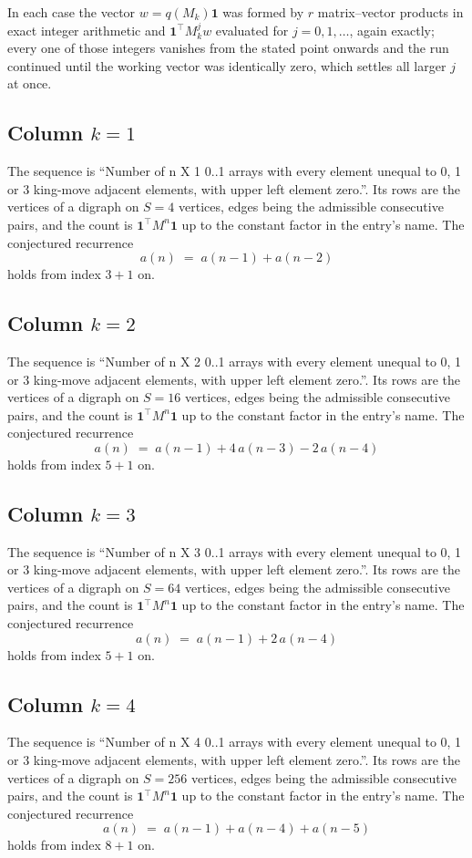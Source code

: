 \documentclass[11pt,a4paper]{article}
\theoremstyle{plain}
\theoremstyle{definition}
\begin{document}
In each case the vector $w=q(M_k)\mathbf{1}$ was formed by $r$ matrix--vector products in
exact integer arithmetic and $\mathbf{1}^{\!\top}M_k^{j}w$ evaluated for $j=0,1,\dots$,
again exactly; every one of those integers vanishes from the stated point onwards and the run
continued until the working vector was identically zero, which settles all larger $j$ at once.

\subsection*{Column $k$$=1$}
The sequence is ``Number of n X 1 0..1 arrays with every element unequal to 0, 1 or 3 king-move adjacent elements, with upper left element zero.''. Its rows are the vertices of a digraph on
$S=4$ vertices, edges being the admissible consecutive pairs, and the count is
$\mathbf{1}^{\!\top}M^{n}\mathbf{1}$ up to the constant factor in the entry's name.
The conjectured recurrence
\[
a(n)\;=\;a(n-1) + a(n-2)
\]
holds from index $3+1$ on.

\subsection*{Column $k$$=2$}
The sequence is ``Number of n X 2 0..1 arrays with every element unequal to 0, 1 or 3 king-move adjacent elements, with upper left element zero.''. Its rows are the vertices of a digraph on
$S=16$ vertices, edges being the admissible consecutive pairs, and the count is
$\mathbf{1}^{\!\top}M^{n}\mathbf{1}$ up to the constant factor in the entry's name.
The conjectured recurrence
\[
a(n)\;=\;a(n-1) + 4\,a(n-3) - 2\,a(n-4)
\]
holds from index $5+1$ on.

\subsection*{Column $k$$=3$}
The sequence is ``Number of n X 3 0..1 arrays with every element unequal to 0, 1 or 3 king-move adjacent elements, with upper left element zero.''. Its rows are the vertices of a digraph on
$S=64$ vertices, edges being the admissible consecutive pairs, and the count is
$\mathbf{1}^{\!\top}M^{n}\mathbf{1}$ up to the constant factor in the entry's name.
The conjectured recurrence
\[
a(n)\;=\;a(n-1) + 2\,a(n-4)
\]
holds from index $5+1$ on.

\subsection*{Column $k$$=4$}
The sequence is ``Number of n X 4 0..1 arrays with every element unequal to 0, 1 or 3 king-move adjacent elements, with upper left element zero.''. Its rows are the vertices of a digraph on
$S=256$ vertices, edges being the admissible consecutive pairs, and the count is
$\mathbf{1}^{\!\top}M^{n}\mathbf{1}$ up to the constant factor in the entry's name.
The conjectured recurrence
\[
a(n)\;=\;a(n-1) + a(n-4) + a(n-5)
\]
holds from index $8+1$ on.
\end{document}
